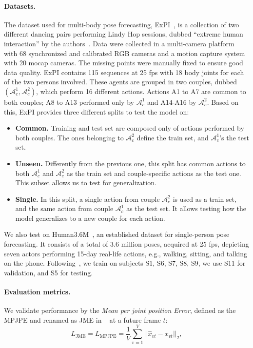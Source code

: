 \documentclass[10pt,twocolumn,letterpaper]{article}
\begin{document}
\paragraph{Datasets.} The dataset used for multi-body pose forecasting, ExPI~\cite{guo21}, is a collection of two different dancing pairs performing Lindy Hop sessions, dubbed ``extreme human interaction'' by the authors~\cite{guo21}.
Data were collected in a multi-camera platform with 68 synchronized and calibrated RGB cameras and a motion capture system with 20 mocap cameras. The missing points were manually fixed to ensure good data quality. 
ExPI contains 115 sequences at 25 fps with 18 body joints for each of the two persons involved.
These agents are grouped in two couples, dubbed $(\mathcal{A}^1_{c}, \mathcal{A}^2_{c})$, which perform 16 different actions. Actions A1 to A7 are common to both couples; A8 to A13 performed only by $\mathcal{A}^1_{c}$ and A14-A16 by $\mathcal{A}^2_{c}$.
Based on this, ExPI provides three different splits to test the model on:
\begin{itemize}
    \item \textbf{Common.} Training and test set are composed only of actions performed by both couples. The ones belonging to $\mathcal{A}^2_{c}$ define the train set, and $\mathcal{A}^1_{c}$'s the test set.
    \item \textbf{Unseen.} Differently from the previous one, this split has common actions to both $\mathcal{A}^1_{c}$ and $\mathcal{A}^2_{c}$ as the train set and couple-specific actions as the test one. 
    This subset allows us to test for generalization.
    \item \textbf{Single.}
    In this split, a single action from couple $\mathcal{A}^2_{c}$ is used as a train set, and the same action from couple $\mathcal{A}^1_{c}$ as the test set. 
    It allows testing how the model generalizes to a new couple for each action.
\end{itemize}

We also test on Human3.6M~\cite{h36m}, an established dataset for single-person pose forecasting.
It consists of a total of 3.6 million poses, acquired at 25 fps, depicting seven actors performing 15-day real-life actions, e.g., walking, sitting, and talking on the phone.
Following~\cite{mao21multi, mao20his, Dang21}, we train on subjects S1, S6, S7, S8, S9, we use S11 for validation, and S5 for testing. 


\paragraph{Evaluation metrics.}
We validate performance by the \textit{Mean per joint position Error}, defined as the MPJPE \cite{h36m, mao19ltd} and renamed as JME in ~\cite{guo21}  at a future frame $t$:
\begin{equation}
    L_{\text{JME}} = L_{\text{MPJPE}} = \frac{1}{V}\sum^V_{v=1} ||\hat{x}_{vt} - x_{vt}||_2,
    \label{jme}
\end{equation}
\end{document}
